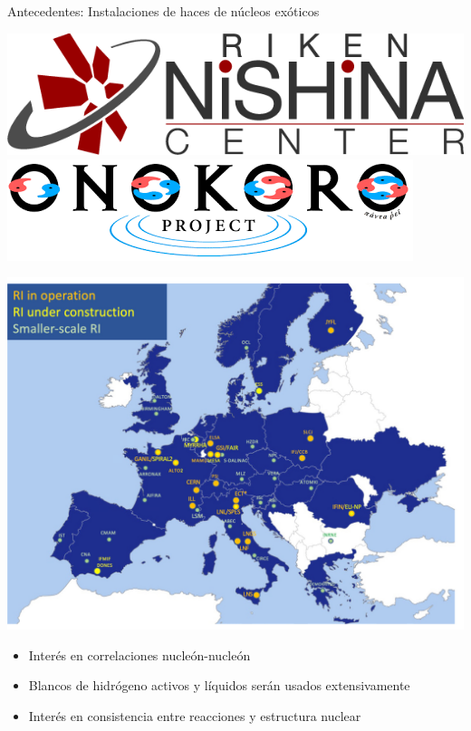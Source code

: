 \documentclass{beamer}
\begin{document}
\begin{frame}{Antecedentes: Instalaciones de haces de núcleos exóticos}
    \begin{minipage}{0.45\textwidth}
    \begin{center}
    \includegraphics[height=0.15\textheight, width=\textwidth, keepaspectratio]{riken.png}
    \vspace{0.3cm}
    \includegraphics[height=0.15\textheight, width=\textwidth, keepaspectratio]{onokoro.png}
    \end{center}
    \end{minipage}
    \begin{minipage}{0.45\textwidth}
    \begin{center}
    \includegraphics[height=0.3\textheight]{EuRI.png}
    \end{center}
    \end{minipage}
    
    \begin{itemize}
    \item Interés en correlaciones nucleón-nucleón
    \item Blancos de hidrógeno activos y líquidos serán usados extensivamente
    \item Interés en consistencia entre reacciones y estructura nuclear
    \end{itemize}
\end{frame}
\end{document}
